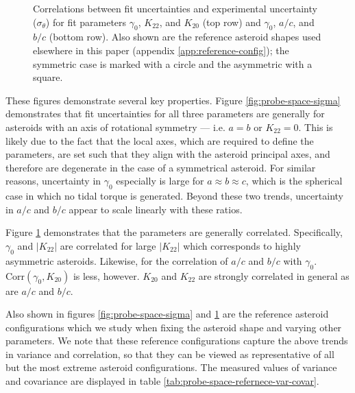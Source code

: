 \documentclass{aastex631}
\begin{document}
\begin{figure}
  \caption{Correlations between fit uncertainties and experimental uncertainty ($\sigma_\theta$) for fit parameters $\gamma_0$, $K_{22}$, and $K_{20}$ (top row) and $\gamma_0$, $a/c$, and $b/c$ (bottom row). Also shown are the reference asteroid shapes used elsewhere in this paper (appendix \ref{app:reference-config}); the symmetric case is marked with a circle and the asymmetric with a square.}
  \label{fig:probe-space-corr}
\end{figure}

These figures demonstrate several key properties. Figure \ref{fig:probe-space-sigma} demonstrates that fit uncertainties for all three parameters are generally for asteroids with an axis of rotational symmetry --- i.e. $a=b$ or $K_{22} = 0$. This is likely due to the fact that the local axes, which are required to define the parameters, are set such that they align with the asteroid principal axes, and therefore are degenerate in the case of a symmetrical asteroid. For similar reasons, uncertainty in $\gamma_0$ especially is large for $a \approx b \approx c$, which is the spherical case in which no tidal torque is generated. Beyond these two trends, uncertainty in $a/c$ and $b/c$ appear to scale linearly with these ratios. 

Figure \ref{fig:probe-space-corr} demonstrates that the parameters are generally correlated. Specifically, $\gamma_0$ and $|K_{22}|$ are correlated for large $|K_{22}|$ which corresponds to highly asymmetric asteroids. Likewise, for the correlation of $a/c$ and $b/c$ with $\gamma_0$. $\mathrm{Corr}(\gamma_0, K_{20})$ is less, however. $K_{20}$ and $K_{22}$ are strongly correlated in general as are $a/c$ and $b/c$.

Also shown in figures \ref{fig:probe-space-sigma} and \ref{fig:probe-space-corr} are the reference asteroid configurations which we study when fixing the asteroid shape and varying other parameters. We note that these reference configurations capture the above trends in variance and correlation, so that they can be viewed as representative of all but the most extreme asteroid configurations. The measured values of variance and covariance are displayed in table \ref{tab:probe-space-refernece-var-covar}.
\end{document}

